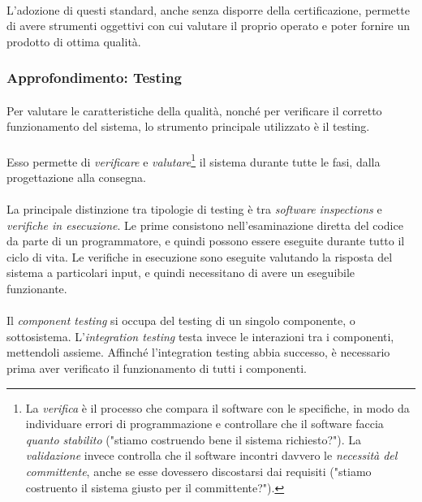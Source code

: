 \documentclass[11pt,a4paper,english]{article}
\begin{document}
\paragraph{} L'adozione di questi standard, anche senza disporre della certificazione, permette di avere strumenti oggettivi con cui valutare il proprio operato e poter fornire un prodotto di ottima qualità.


\subsubsection{Approfondimento: Testing}

\paragraph{} Per valutare le caratteristiche della qualità, nonché per verificare il corretto funzionamento del sistema, lo strumento principale utilizzato è il testing. 

\paragraph{} Esso permette di \emph{verificare} e \emph{valutare}\footnote{La \emph{verifica} è il processo che compara il software con le specifiche, in modo da individuare errori di programmazione e controllare che il software faccia \emph{quanto stabilito} ("stiamo costruendo bene il sistema richiesto?"). La \emph{validazione} invece controlla che il software incontri davvero le \emph{necessità del committente}, anche se esse dovessero discostarsi dai requisiti ("stiamo costruento il sistema giusto per il committente?").} il sistema durante tutte le fasi, dalla progettazione alla consegna. 

\paragraph{} La principale distinzione tra tipologie di testing è tra \emph{software inspections} e \emph{verifiche in esecuzione}. Le prime consistono nell'esaminazione diretta del codice da parte di un programmatore, e quindi possono essere eseguite durante tutto il ciclo di vita. Le verifiche in esecuzione sono eseguite valutando la risposta del sistema a particolari input, e quindi necessitano di avere un eseguibile funzionante.

\paragraph{} Il \emph{component testing} si occupa del testing di un singolo componente, o sottosistema. L'\emph{integration testing} testa invece le interazioni tra i componenti, mettendoli assieme. Affinché l'integration testing abbia successo, è necessario prima aver verificato il funzionamento di tutti i componenti. 
\end{document}
